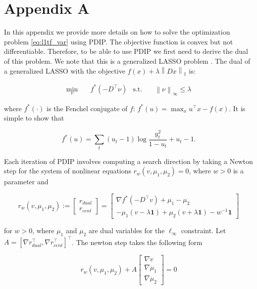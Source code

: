 \documentclass{article}
\newcommand{\one}{\mathbf{1}}
\newcommand{\norm}[1]{\left\lVert #1 \right\rVert}
\begin{document}
\section{Appendix A}
\label{sec:app_l1tf_var}

In this appendix we provide more details on how to solve the optimization problem \ref{eq:l1tf_var} using PDIP. The objective function is convex but not differentiable. Therefore, to be able to use PDIP we first need to derive the dual of this problem. We note that this is a generalized LASSO problem \citep{tibshirani_solution_2011}. The dual of a generalized LASSO with the objective $f(x)+\lambda \norm{ Dx }_1$ is:  

\begin{align}
\min_\nu&\quad f^*(-D^\top\nu) & \mbox{s.t.}&\quad \norm{ \nu }_\infty \le \lambda
\end{align}

where $f^*(\cdot)$ is the Fenchel conjugate of $f$: $f^*(u)=\max_x u^\top x-f(x)$. It is simple to show that 

\begin{equation}
f^*(u)=\sum_t (u_t-1)\log\frac{y_t^2}{1-u_t} + u_t-1.
\label{eq:conj}
\end{equation}

Each iteration of PDIP involves computing a search direction by taking a Newton step for the system of nonlinear equations $r_w(v,\mu_1,\mu_2)=0$, where $w>0$ is a parameter and

\begin{equation}
  r_w(v,\mu_1,\mu_2):=
	\begin{bmatrix}
	r_{dual}\\
	r_{cent}	
	\end{bmatrix}=
  \begin{bmatrix}
    \nabla f^*(-D^\top v) + \mu_1 - \mu_2\\
    -\mu_1(v-\lambda\one)+\mu_2(v + \lambda\one) -w^{-1}\one
  \end{bmatrix}
\label{eq:resid}
\end{equation}

for $w>0$, where $\mu_1$ and $\mu_2$ are dual variables for the $\ell_\infty$ constraint. Let $A=[\nabla r_{dual}^\top , \nabla r_{cent}^\top]^\top$. The newton step takes the following form

\begin{equation}
r_w(v,\mu_1,\mu_2)+A
\begin{bmatrix}
	\nabla v\\
	\nabla \mu_1\\
	\nabla \mu_2	
	\end{bmatrix}= 0
\label{eq:newton_step}
\end{equation}
\end{document}
